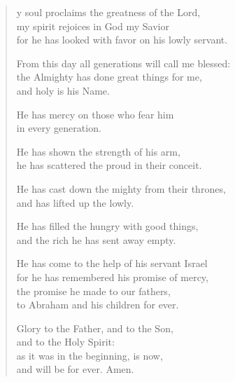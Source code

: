 \begin{verse}
  \begin{patverse}
y soul proclaims the greatness of the Lord,\Flex\\
my spirit rejoices in God my Savior\Med\\
for he has looked with favor on his lowly servant.

From this day all generations will call me blessed:\Flex\\
the Almighty has done great things for me,\Med\\
and holy is his Name.

He has mercy on those who fear him\Med\\
in every generation.

He has shown the strength of his arm,\Med\\
he has scattered the proud in their conceit.

He has cast down the mighty from their thrones,\Med\\
and has lifted up the lowly.

He has filled the hungry with good things,\Med\\
and the rich he has sent away empty.

He has come to the help of his servant Israel\Med\\
for he has remembered his promise of mercy,\\
the promise he made to our fathers,\Med\\
to Abraham and his children for ever.

Glory to the Father, and to the Son,\Med\\
and to the Holy Spirit:\\
as it was in the beginning, is now,\Med\\
and will be for ever. Amen.
  \end{patverse}
\end{verse}
